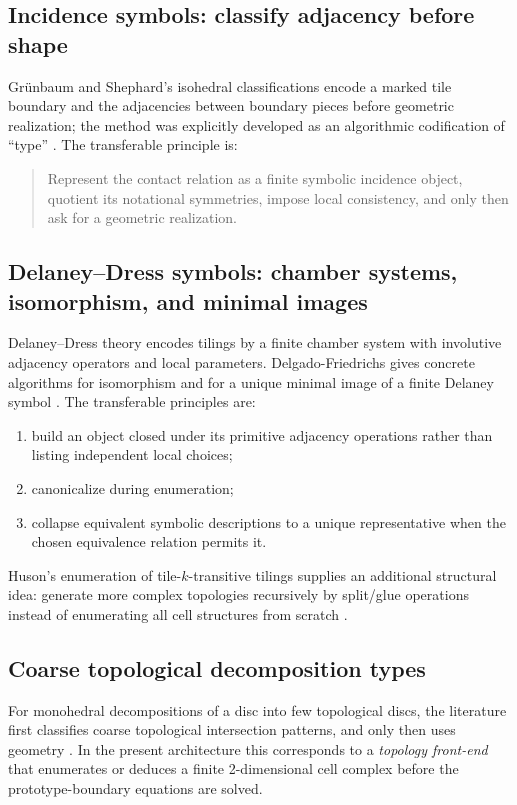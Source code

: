 \documentclass[11pt]{article}
\begin{document}
\subsection{Incidence symbols: classify adjacency before shape}

Gr\"unbaum and Shephard's isohedral classifications encode a marked tile boundary and the adjacencies between boundary pieces before geometric realization; the method was explicitly developed as an algorithmic codification of ``type'' \cite{GS1977,GS1979}.  The transferable principle is:
\begin{quote}
Represent the contact relation as a finite symbolic incidence object, quotient its notational symmetries, impose local consistency, and only then ask for a geometric realization.
\end{quote}

\subsection{Delaney--Dress symbols: chamber systems, isomorphism, and minimal images}

Delaney--Dress theory encodes tilings by a finite chamber system with involutive adjacency operators and local parameters.  Delgado-Friedrichs gives concrete algorithms for isomorphism and for a unique minimal image of a finite Delaney symbol \cite{Delgado2003}.  The transferable principles are:
\begin{enumerate}
  \item build an object closed under its primitive adjacency operations rather than listing independent local choices;
  \item canonicalize during enumeration;
  \item collapse equivalent symbolic descriptions to a unique representative when the chosen equivalence relation permits it.
\end{enumerate}
Huson's enumeration of tile-$k$-transitive tilings supplies an additional structural idea: generate more complex topologies recursively by split/glue operations instead of enumerating all cell structures from scratch \cite{Huson1993}.

\subsection{Coarse topological decomposition types}

For monohedral decompositions of a disc into few topological discs, the literature first classifies coarse topological intersection patterns, and only then uses geometry \cite{BasitLangi2024,KurusaLangiVigh2020}.  In the present architecture this corresponds to a \emph{topology front-end} that enumerates or deduces a finite 2-dimensional cell complex before the prototype-boundary equations are solved.
\end{document}
